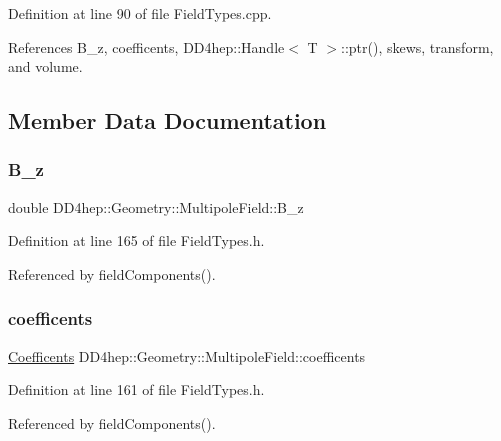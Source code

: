 Definition at line 90 of file Field\+Types.\+cpp.



References B\+\_\+z, coefficents, D\+D4hep\+::\+Handle$<$ T $>$\+::ptr(), skews, transform, and volume.



\subsection{Member Data Documentation}
\hypertarget{class_d_d4hep_1_1_geometry_1_1_multipole_field_a5b182acb00dda0675a4166293230e948}{}\label{class_d_d4hep_1_1_geometry_1_1_multipole_field_a5b182acb00dda0675a4166293230e948} 
\subsubsection{\texorpdfstring{B\+\_\+z}{B\_z}}
{\footnotesize\ttfamily double D\+D4hep\+::\+Geometry\+::\+Multipole\+Field\+::\+B\+\_\+z}



Definition at line 165 of file Field\+Types.\+h.



Referenced by field\+Components().

\hypertarget{class_d_d4hep_1_1_geometry_1_1_multipole_field_a0d73fa0209b6773df83c05b53060324a}{}\label{class_d_d4hep_1_1_geometry_1_1_multipole_field_a0d73fa0209b6773df83c05b53060324a} 
\subsubsection{\texorpdfstring{coefficents}{coefficents}}
{\footnotesize\ttfamily \hyperlink{class_d_d4hep_1_1_geometry_1_1_multipole_field_a760b1b7561c93dd8438ea523cbc660bc}{Coefficents} D\+D4hep\+::\+Geometry\+::\+Multipole\+Field\+::coefficents}



Definition at line 161 of file Field\+Types.\+h.



Referenced by field\+Components().

